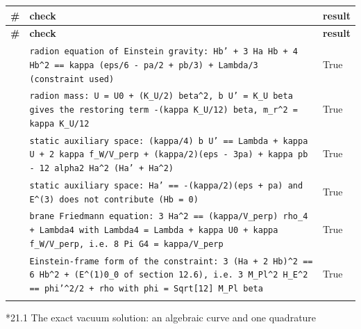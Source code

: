 \documentclass[10pt,a4paper]{article}
\makeatletter
\renewcommand\subsubsection{\@startsection{subsubsection}{3}{\z@}{-3.25ex\@plus -1ex \@minus -.2ex}{1.5ex \@plus .2ex}{\normalfont\normalsize\bfseries\raggedright}}
\makeatother
\begin{document}
{\footnotesize
\begin{longtable}{>{\raggedright\arraybackslash}p{}>{\raggedright\arraybackslash}p{}>{\raggedright\arraybackslash}p{}}
\toprule
\textbf{\#} & \textbf{check} & \textbf{result} \\
\midrule\endfirsthead
\toprule
\textbf{\#} & \textbf{check} & \textbf{result} \\
\midrule\endhead
\endfoot
\bottomrule\endlastfoot
360 & \texttt{radion equation of Einstein gravity: Hb' + 3 Ha Hb + 4 Hb\textasciicircum{}2 == kappa (eps/\allowbreak{}6 - pa/\allowbreak{}2 + pb/\allowbreak{}3) + Lambda/\allowbreak{}3 (constraint used)} & True \\
361 & \texttt{radion mass: U = U0 + (K\_\allowbreak{}U/\allowbreak{}2) beta\textasciicircum{}2, b U' = K\_\allowbreak{}U beta gives the restoring term -(kappa K\_\allowbreak{}U/\allowbreak{}12) beta, m\_\allowbreak{}r\textasciicircum{}2 = kappa K\_\allowbreak{}U/\allowbreak{}12} & True \\
362 & \texttt{static auxiliary space: (kappa/\allowbreak{}4) b U' == Lambda + kappa U + 2 kappa f\_\allowbreak{}W/\allowbreak{}V\_\allowbreak{}perp + (kappa/\allowbreak{}2)(eps - 3pa) + kappa pb - 12 alpha2 Ha\textasciicircum{}2 (Ha' + Ha\textasciicircum{}2)} & True \\
363 & \texttt{static auxiliary space: Ha' == -(kappa/\allowbreak{}2)(eps + pa) and E\textasciicircum{}(3) does not contribute (Hb = 0)} & True \\
364 & \texttt{brane Friedmann equation: 3 Ha\textasciicircum{}2 == (kappa/\allowbreak{}V\_\allowbreak{}perp) rho\_\allowbreak{}4 + Lambda4 with Lambda4 = Lambda + kappa U0 + kappa f\_\allowbreak{}W/\allowbreak{}V\_\allowbreak{}perp, i.e. 8 Pi G4 = kappa/\allowbreak{}V\_\allowbreak{}perp} & True \\
365 & \texttt{Einstein-frame form of the constraint: 3 (Ha + 2 Hb)\textasciicircum{}2 == 6 Hb\textasciicircum{}2 + (E\textasciicircum{}(1)0\_\allowbreak{}0 of section 12.6), i.e. 3 M\_\allowbreak{}Pl\textasciicircum{}2 H\_\allowbreak{}E\textasciicircum{}2 == phi'\textasciicircum{}2/\allowbreak{}2 + rho with phi = Sqrt[12] M\_\allowbreak{}Pl beta} & True \\*
\end{longtable}}
\subsubsection*{21.1 The exact vacuum solution: an algebraic curve and one quadrature}
\end{document}
